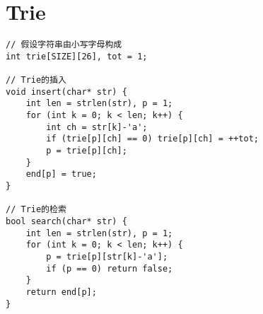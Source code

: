 \section{Trie}
\begin{lstlisting}
// 假设字符串由小写字母构成
int trie[SIZE][26], tot = 1;

// Trie的插入
void insert(char* str) {
    int len = strlen(str), p = 1;
    for (int k = 0; k < len; k++) {
        int ch = str[k]-'a';
        if (trie[p][ch] == 0) trie[p][ch] = ++tot;
        p = trie[p][ch];
    }
    end[p] = true;
}

// Trie的检索
bool search(char* str) {
    int len = strlen(str), p = 1;
    for (int k = 0; k < len; k++) {
        p = trie[p][str[k]-'a'];
        if (p == 0) return false;
    }
    return end[p];
}
\end{lstlisting}